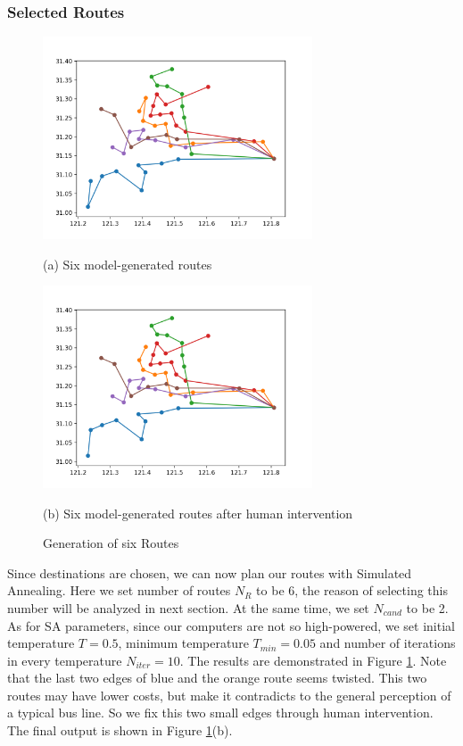 \documentclass{mcmthesis}
\begin{document}
\subsubsection{Selected Routes}

\begin{figure}[htbp]
    \begin{minipage}{0.45\linewidth}
      \centerline{\includegraphics[width=8cm]{figures/6routesprime.png}}
      \caption*{(a) Six model-generated routes}
    \end{minipage}
    \hspace{0.5in}
    \begin{minipage}{0.45\linewidth}
      \centerline{\includegraphics[width=8cm]{figures/6routes.png}}
      \caption*{(b) Six model-generated routes after human intervention}
    \end{minipage}
    \caption{Generation of six Routes}
    \label{fig:routes}
\end{figure}
Since destinations are chosen, we can now plan our routes with Simulated Annealing. Here we set number of routes $N_R$ to be 6, the reason of selecting this number will  be analyzed in next section. At the same time, we set $N_{cand}$ to be 2. As for SA parameters,  since our computers are not so high-powered, we set initial temperature $T=0.5$, minimum temperature $T_{min}=0.05$ and number of iterations in every temperature $N_{iter}=10$. The results are demonstrated in Figure \ref{fig:routes}. Note that the last two edges of blue and the orange route seems twisted. This two routes may have lower costs, but make it contradicts to the general perception of a typical bus line. So we fix this two small edges through human intervention. The final output is shown in Figure \ref{fig:routes}(b).
\end{document}
